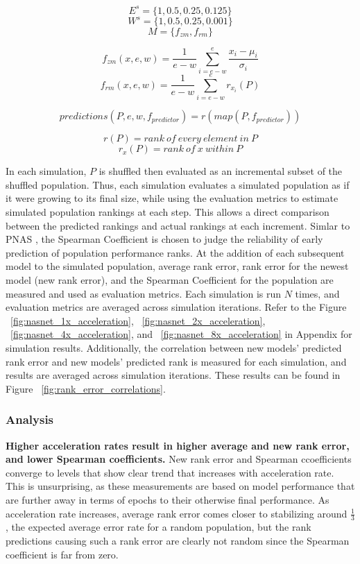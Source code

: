 \documentclass[twocolumn]{article}
\begin{document}
\[E^s = \{1, 0.5, 0.25, 0.125\}\]
\[W^s = \{1, 0.5, 0.25, 0.001\}\]
\[M = \{f_{zm}, f_{rm}\}\]

\[f_{zm}(x, e, w) = \frac{1}{e-w}\sum_{i=e-w}^{e}\frac{x_i - \mu_i}{\sigma_i}\]
\[f_{rm}(x, e, w) = \frac{1}{e-w}\sum_{i=e-w}^{e}r_{x_{i}}(P)\]

\[predictions(P, e, w, f_{predictor}) = r(map(P, f_{predictor}))\]

\[r(P) = rank\ of\ every\ element\ in\ P\]
\[r_{x}(P) = rank\ of\ x\ within\ P\]

In each simulation, $P$ is shuffled then evaluated as an incremental subset of the shuffled population.
Thus, each simulation evaluates a simulated population as if it were growing to its final size, while using
the evaluation metrics to estimate simulated population rankings at each step.
This allows a direct comparison between the predicted rankings and actual rankings at each increment.
Simlar to PNAS \cite{pnas}, the Spearman Coefficient is chosen to judge the reliability of early prediction of population performance ranks.
At the addition of each subsequent model to the simulated population, average rank error, rank error for the newest model (new rank error), and the Spearman Coefficient
for the population are measured and used as evaluation metrics. 
Each simulation is run $N$ times, and evaluation metrics are averaged across simulation iterations. 
Refer to the Figure ~\ref{fig:nasnet_1x_acceleration}, ~\ref{fig:nasnet_2x_acceleration}, ~\ref{fig:nasnet_4x_acceleration}, and ~\ref{fig:nasnet_8x_acceleration} in Appendix for simulation results.
Additionally, the correlation between new models' predicted rank error and new models' predicted rank is measured for each simulation,
and results are averaged across simulation iterations. These results can be found in Figure ~\ref{fig:rank_error_correlations}.

\subsubsection{Analysis}

\textbf{Higher acceleration rates result in higher average and new rank error, and lower Spearman coefficients.}
New rank error and Spearman ccoefficients converge to levels that show clear trend that increases with acceleration rate.
This is unsurprising, as these measurements are based on model performance that are further away in terms of epochs to their
otherwise final performance. 
As acceleration rate increases, average rank error comes closer to stabilizing around $\frac{1}{3}$, the expected average error rate
for a random population, but the rank predictions causing such a rank error are clearly not random since the Spearman coefficient is far from zero.
\end{document}
